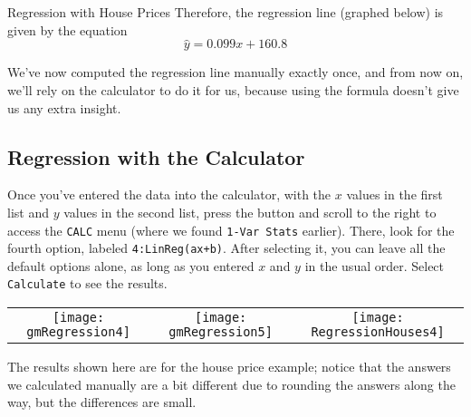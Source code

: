 \begin{example}[https://www.youtube.com/watch?v=hlY2MbHaBfE&list=PLfmpjsIzhzttL_Uec2nCbDRcAcUF7NKG8&index=19]{Regression with House Prices}
Therefore, the regression line (graphed below) is given by the equation
\[\boxed{\hat{y} = 0.099 x + 160.8}\]

\begin{center}
\end{center}
\end{example}

We've now computed the regression line manually exactly once, and from now on, we'll rely on the calculator to do it for us, because using the formula doesn't give us any extra insight.

\subsection{Regression with the Calculator}
Once you've entered the data into the calculator, with the $x$ values in the first list and $y$ values in the second list, press the  button and scroll to the right to access the \texttt{CALC} menu (where we found \texttt{1-Var Stats} earlier).  There, look for the fourth option, labeled \texttt{4:LinReg(ax+b)}.  After selecting it, you can leave all the default options alone, as long as you entered $x$ and $y$ in the usual order.  Select \texttt{Calculate} to see the results.
\begin{center}
\begin{tabular}{c c c}
\texttt{[image: gmRegression4]}
& \texttt{[image: gmRegression5]}
& \texttt{[image: RegressionHouses4]}
\end{tabular}
\end{center}
The results shown here are for the house price example; notice that the answers we calculated manually are a bit different due to rounding the answers along the way, but the differences are small.

